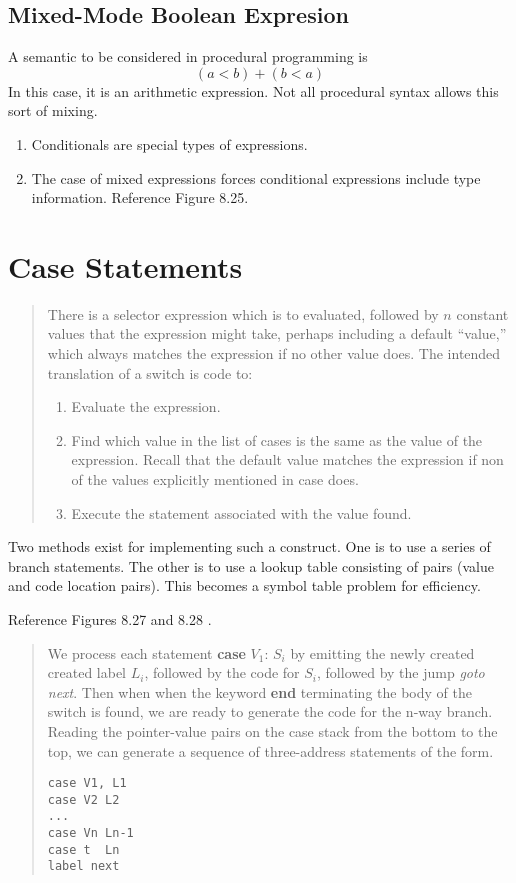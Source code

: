 \subsection{Mixed-Mode Boolean Expresion}

A semantic to be considered in procedural programming is 
\[  ( a < b) + (b < a) \]  
In this case, it is an arithmetic expression.    Not all procedural syntax allows this sort of mixing.   
\begin{enumerate}
\item Conditionals are special types of expressions.
\item The case of mixed expressions forces conditional expressions include type information.   Reference Figure 8.25.  
\end{enumerate}


\section {Case Statements}
\begin{quote}
There is a selector expression which is to evaluated, followed by $n$ constant values that the expression might take, perhaps including a default ``value,'' which always matches the expression if no other value does.  The intended translation of a switch is code to:
\begin{enumerate}
\item Evaluate the expression.
\item Find which value in the list of cases is the same as the value of the expression.  Recall that the default value matches the expression if non of the values explicitly mentioned in case does.  
\item Execute the statement associated with the value found.   
\end{enumerate}
\end{quote}

Two methods exist for implementing such a construct.  One is to use a series of branch statements.  The other is to use a lookup table consisting of pairs (value and code location pairs).    This becomes a symbol table problem for efficiency.  

Reference Figures 8.27 and 8.28  .  

\begin{quote}
We process each statement \textbf{case} $V_1$: $S_i$ by emitting the newly created created label $L_i$, followed by the code for $S_i$, followed by the jump \textsl{goto next}.  Then when when the keyword \textbf{end} terminating the body of the switch is found, we are ready to generate the code for the n-way branch.  Reading the pointer-value pairs on the case stack from the bottom to the top, we can generate a sequence of three-address statements of the form.
\begin{lstlisting}
case V1, L1
case V2 L2
...
case Vn Ln-1
case t  Ln
label next
\end{lstlisting}
\end{quote}


